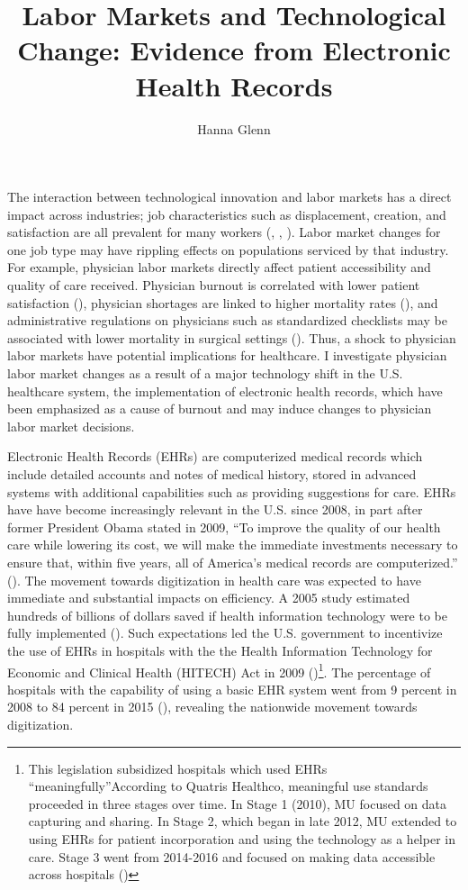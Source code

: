 \documentclass[11pt]{article}
\title{Labor Markets and Technological Change: Evidence from Electronic Health Records}
\author{Hanna Glenn}
\begin{document}
\maketitle



\vspace{1.5cm}

The interaction between technological innovation and labor markets has a direct impact across industries; job characteristics such as displacement, creation, and satisfaction are all prevalent for many workers (\cite{autor2003skill}, \cite{fallick1996review}, \cite{akerlof1988job}). Labor market changes for one job type may have rippling effects on populations serviced by that industry. For example, physician labor markets directly affect patient accessibility and quality of care received. Physician burnout is correlated with lower patient satisfaction (\cite{shanafelt2002burnout}), physician shortages are linked to higher mortality rates (\cite{gong2019higher}), and administrative regulations on physicians such as standardized checklists may be associated with lower mortality in surgical settings (\cite{treadwell2014surgical}). Thus, a shock to physician labor markets have potential implications for healthcare. I investigate physician labor market changes as a result of a major technology shift in the U.S. healthcare system, the implementation of electronic health records, which have been emphasized as a cause of burnout and may induce changes to physician labor market decisions.

Electronic Health Records (EHRs) are computerized medical records which include detailed accounts and notes of medical history, stored in advanced systems with additional capabilities such as providing suggestions for care. EHRs have have become increasingly relevant in the U.S. since 2008, in part after former President Obama stated in 2009, “To improve the quality of our health care while lowering its cost, we will make the immediate investments necessary to ensure that, within five years, all of America’s medical records are computerized.” (\cite{presquote}). The movement towards digitization in health care was expected to have immediate and substantial impacts on efficiency. A 2005 study estimated hundreds of billions of dollars saved if health information technology were to be fully implemented (\cite{hillestad2005}). Such expectations led the U.S. government to incentivize the use of EHRs in hospitals with the the Health Information Technology for Economic and Clinical Health (HITECH) Act in 2009 (\cite{hitech})\footnote{This legislation subsidized hospitals which used EHRs “meaningfully”According to Quatris Healthco, meaningful use standards proceeded in three stages over time. In Stage 1 (2010), MU focused on data capturing and sharing. In Stage 2, which began in late 2012, MU extended to using EHRs for patient incorporation and using the technology as a helper in care. Stage 3 went from 2014-2016 and focused on making data accessible across hospitals (\cite{meanuse})}. The percentage of hospitals with the capability of using a basic EHR system went from 9 percent in 2008 to 84 percent in 2015 (\cite{stats}), revealing the nationwide movement towards digitization.
\end{document}
